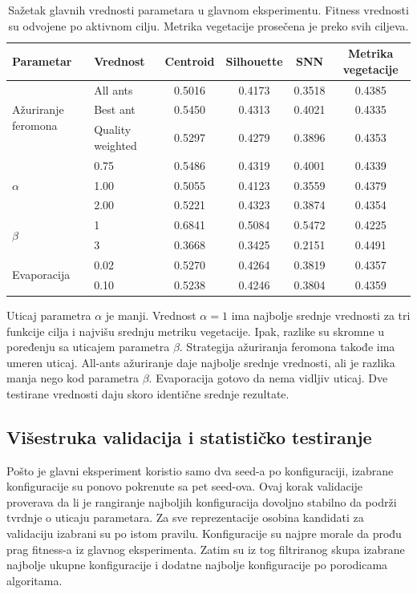 \documentclass[11pt]{article}
\begin{document}
\begin{table}[ht]
\centering
\caption{Sažetak glavnih vrednosti parametara u glavnom eksperimentu. Fitness vrednosti su odvojene po aktivnom cilju. Metrika vegetacije prosečena je preko svih ciljeva.}
\label{tab:main_parameter_summary}
\begin{tabular}{llcccc}
\hline
\textbf{Parametar} & \textbf{Vrednost} & \textbf{Centroid} & \textbf{Silhouette} & \textbf{SNN} & \textbf{Metrika vegetacije} \\
\hline
\multirow{3}{*}{Ažuriranje feromona} & All ants & 0.5016 & 0.4173 & 0.3518 & 0.4385 \\
 & Best ant & 0.5450 & 0.4313 & 0.4021 & 0.4335 \\
 & Quality weighted & 0.5297 & 0.4279 & 0.3896 & 0.4353 \\
\hline
\multirow{3}{*}{$\alpha$} & 0.75 & 0.5486 & 0.4319 & 0.4001 & 0.4339 \\
 & 1.00 & 0.5055 & 0.4123 & 0.3559 & 0.4379 \\
 & 2.00 & 0.5221 & 0.4323 & 0.3874 & 0.4354 \\
\hline
\multirow{2}{*}{$\beta$} & 1 & 0.6841 & 0.5084 & 0.5472 & 0.4225 \\
 & 3 & 0.3668 & 0.3425 & 0.2151 & 0.4491 \\
\hline
\multirow{2}{*}{Evaporacija} & 0.02 & 0.5270 & 0.4264 & 0.3819 & 0.4357 \\
 & 0.10 & 0.5238 & 0.4246 & 0.3804 & 0.4359 \\
\hline
\end{tabular}
\end{table}

Uticaj parametra $\alpha$ je manji. Vrednost $\alpha=1$ ima najbolje srednje vrednosti za tri funkcije cilja i najvišu srednju metriku vegetacije. Ipak, razlike su skromne u poređenju sa uticajem parametra $\beta$. Strategija ažuriranja feromona takođe ima umeren uticaj. All-ants ažuriranje daje najbolje srednje vrednosti, ali je razlika manja nego kod parametra $\beta$. Evaporacija gotovo da nema vidljiv uticaj. Dve testirane vrednosti daju skoro identične srednje rezultate.

\subsection{Višestruka validacija i statističko testiranje}

Pošto je glavni eksperiment koristio samo dva seed-a po konfiguraciji, izabrane konfiguracije su ponovo pokrenute sa pet seed-ova. Ovaj korak validacije proverava da li je rangiranje najboljih konfiguracija dovoljno stabilno da podrži tvrdnje o uticaju parametara. Za sve reprezentacije osobina kandidati za validaciju izabrani su po istom pravilu. Konfiguracije su najpre morale da prođu prag fitness-a iz glavnog eksperimenta. Zatim su iz tog filtriranog skupa izabrane najbolje ukupne konfiguracije i dodatne najbolje konfiguracije po porodicama algoritama.
\end{document}
